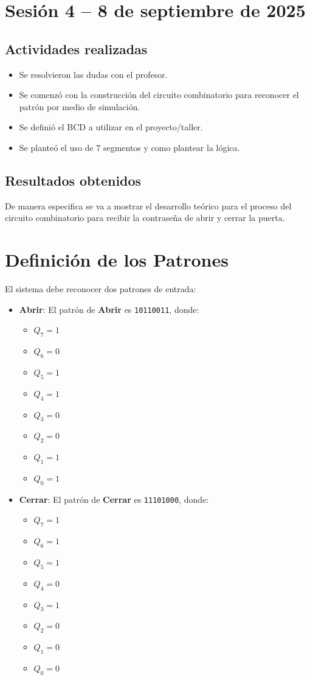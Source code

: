 \documentclass[12pt,letterpaper]{article}
\begin{document}
\section{Sesión 4 -- 8 de septiembre de 2025}
\subsection*{Actividades realizadas}
\begin{itemize}
    \item Se resolvieron las dudas con el profesor.
    \item Se comenzó con la construcción del circuito combinatorio para reconocer el patrón por medio de simulación.
    \item Se definió el BCD a utilizar en el proyecto/taller.
    \item Se planteó el uso de 7 segmentos y como plantear la lógica.
\end{itemize}

\subsection*{Resultados obtenidos}
De manera especifica se va a mostrar el desarrollo teórico para el proceso del circuito combinatorio para recibir la contraseña de abrir y cerrar la puerta.
\section*{Definición de los Patrones}
El sistema debe reconocer dos patrones de entrada:

\begin{itemize}
  \item \textbf{Abrir}: El patrón de \textbf{Abrir} es \texttt{10110011}, donde:
    \begin{itemize}
      \item $Q_7 = 1$
      \item $Q_6 = 0$
      \item $Q_5 = 1$
      \item $Q_4 = 1$
      \item $Q_3 = 0$
      \item $Q_2 = 0$
      \item $Q_1 = 1$
      \item $Q_0 = 1$
    \end{itemize}
  \item \textbf{Cerrar}: El patrón de \textbf{Cerrar} es \texttt{11101000}, donde:
    \begin{itemize}
      \item $Q_7 = 1$
      \item $Q_6 = 1$
      \item $Q_5 = 1$
      \item $Q_4 = 0$
      \item $Q_3 = 1$
      \item $Q_2 = 0$
      \item $Q_1 = 0$
      \item $Q_0 = 0$
    \end{itemize}
\end{itemize}
\end{document}
